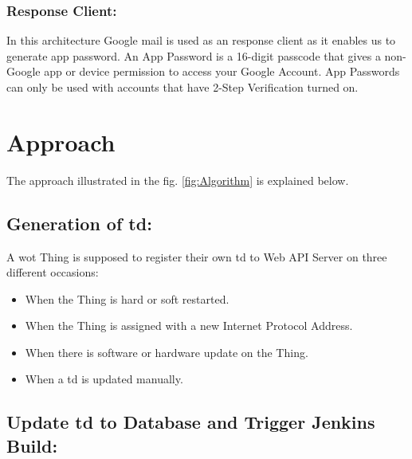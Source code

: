 \documentclass[conference]{IEEEtran}
\theoremstyle{definition}
\begin{document}
\subsubsection{Response Client:}

In this architecture Google mail is used as an response client as it enables us to generate app password. 
An App Password is a 16-digit passcode that gives a non-Google app or device permission to access your Google Account. 
App Passwords can only be used with accounts that have 2-Step Verification turned on.

\section{Approach}

The approach illustrated in the fig. \ref{fig:Algorithm} is explained below.

\subsection{Generation of \ac{td}:}
  
A \ac{wot} Thing is supposed to register their own \ac{td} to Web API Server on three different occasions:

\begin{itemize}
\item When the Thing is hard or soft restarted.
\item When the Thing is assigned with a new Internet Protocol Address.
\item When there is software or hardware update on the Thing.
\item When a \ac{td} is updated manually.
\end{itemize}

\subsection{Update \ac{td} to Database and Trigger Jenkins Build:}
  
\end{document}
